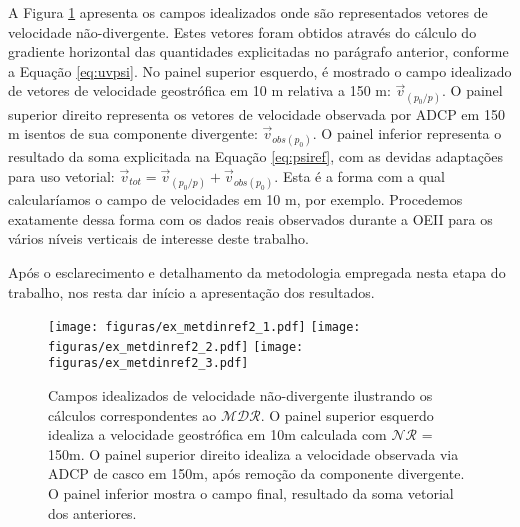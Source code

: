 A Figura \ref{fig:ex_metdinref2} apresenta os campos idealizados onde são representados vetores de velocidade não-divergente.
Estes vetores foram obtidos através do cálculo do gradiente horizontal das quantidades explicitadas no parágrafo anterior,
conforme a Equação \ref{eq:uvpsi}.
No painel superior esquerdo, é mostrado o campo idealizado de vetores de velocidade geostrófica em 10 m relativa a 150 m:
$\vec{v}_{(p_0/p)}$. O painel superior direito representa os vetores de velocidade observada por ADCP em 150 m isentos de sua componente
divergente: $\vec{v}_{obs(p_0)}$. O painel inferior representa o resultado da soma explicitada na Equação \ref{eq:psiref}, com
as devidas adaptações para uso vetorial: $\vec{v}_{tot} = \vec{v}_{(p_0/p)} + \vec{v}_{obs(p_0)}$. Esta é a forma com a qual
calcularíamos o campo de velocidades em 10 m, por exemplo.  Procedemos exatamente dessa 
forma com os dados reais observados durante a OEII para os vários níveis verticais de interesse deste trabalho.    

Após o esclarecimento e detalhamento da metodologia empregada nesta etapa do trabalho, nos resta
dar início a apresentação dos resultados. 


\begin{figure}%
 \begin{center}
  \texttt{[image: figuras/ex\_metdinref2\_1.pdf]}
  \texttt{[image: figuras/ex\_metdinref2\_2.pdf]}
  \texttt{[image: figuras/ex\_metdinref2\_3.pdf]}
 \end{center}
 \vspace{-.25cm}
 \renewcommand{\baselinestretch}{1}
 \caption{\label{fig:ex_metdinref2} \small Campos idealizados de velocidade não-divergente ilustrando os cálculos correspondentes ao
 $\mathcal{MDR}$. O painel superior esquerdo idealiza a velocidade geostrófica em 10m calculada com $\mathcal{NR}$ = 150m. O
painel superior direito idealiza a velocidade observada via ADCP de casco em 150m, após remoção da componente divergente. O
painel inferior mostra o campo final, resultado da soma vetorial dos anteriores.}
\end{figure}














